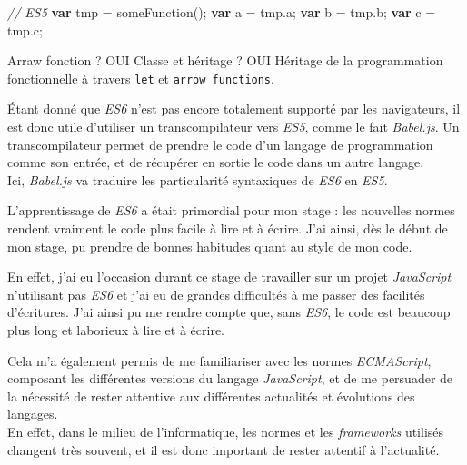 \documentclass[12pt,a4paper]{article}
\newenvironment{Shaded}{}{}
\newcommand{\KeywordTok}[1]{\textcolor[rgb]{0.00,0.44,0.13}{\textbf{{#1}}}}
\newcommand{\CommentTok}[1]{\textcolor[rgb]{0.38,0.63,0.69}{\textit{{#1}}}}
\newcommand{\VariableTok}[1]{\textcolor[rgb]{0.10,0.09,0.49}{{#1}}}
\newcommand{\OperatorTok}[1]{\textcolor[rgb]{0.40,0.40,0.40}{{#1}}}
\newcommand{\AttributeTok}[1]{\textcolor[rgb]{0.49,0.56,0.16}{{#1}}}
\newcommand{\NormalTok}[1]{{#1}}
\begin{document}
\begin{itemize}
\begin{Shaded}
\begin{Highlighting}[]
  \CommentTok{// ES5}
  \KeywordTok{var} \NormalTok{tmp }\OperatorTok{=} \AttributeTok{someFunction}\NormalTok{()}\OperatorTok{;}
  \KeywordTok{var} \NormalTok{a  }\OperatorTok{=} \VariableTok{tmp}\NormalTok{.}\AttributeTok{a}\OperatorTok{;}
  \KeywordTok{var} \NormalTok{b }\OperatorTok{=} \VariableTok{tmp}\NormalTok{.}\AttributeTok{b}\OperatorTok{;}
  \KeywordTok{var} \NormalTok{c }\OperatorTok{=} \VariableTok{tmp}\NormalTok{.}\AttributeTok{c}\OperatorTok{;}
  \end{Highlighting}
  \end{Shaded}
  \end{itemize}

  Arraw fonction ? OUI Classe et héritage ? OUI Héritage de la
  programmation fonctionnelle à travers \texttt{let} et
  \texttt{arrow\ functions}.

  \bigskip

  Étant donné que \emph{ES6} n'est pas encore totalement supporté par les
  navigateurs, il est donc utile d'utiliser un transcompilateur vers
  \emph{ES5}, comme le fait \emph{Babel.js}. Un transcompilateur permet de
  prendre le code d'un langage de programmation comme son entrée, et de
  récupérer en sortie le code dans un autre langage.\\
  Ici, \emph{Babel.js} va traduire les particularité syntaxiques de
  \emph{ES6} en \emph{ES5}.

  \bigskip

  L'apprentissage de \emph{ES6} a était primordial pour mon stage : les
  nouvelles normes rendent vraiment le code plus facile à lire et à
  écrire. J'ai ainsi, dès le début de mon stage, pu prendre de bonnes
  habitudes quant au style de mon code.

  \bigskip

  En effet, j'ai eu l'occasion durant ce stage de travailler sur un projet
  \emph{JavaScript} n'utilisant pas \emph{ES6} et j'ai eu de grandes
  difficultés à me passer des facilités d'écritures. J'ai ainsi pu me
  rendre compte que, sans \emph{ES6}, le code est beaucoup plus long et
  laborieux à lire et à écrire.

  \bigskip

  Cela m'a également permis de me familiariser avec les normes
  \emph{ECMAScript}, composant les différentes versions du langage
  \emph{JavaScript}, et de me persuader de la nécessité de rester
  attentive aux différentes actualités et évolutions des langages.\\
  En effet, dans le milieu de l'informatique, les normes et les
  \emph{frameworks} utilisés changent très souvent, et il est donc
  important de rester attentif à l'actualité.
\end{document}
